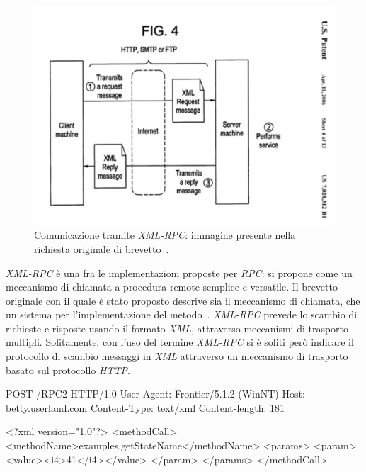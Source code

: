 \begin{figure}[h]
\centering
\includegraphics[scale=0.5, viewport=0 0 646 440]{Immagini/Capitolo3/XMLRPC-patent.pdf}
\caption[Comunicazione tramite \emph{XML-RPC}]{Comunicazione tramite \emph{XML-RPC}: immagine presente nella richiesta originale di brevetto~\cite{MERRICK:2006:misc}.}\label{fig:xmlrpc-patent}
\end{figure}

\emph{XML-RPC} è una fra le implementazioni proposte per \emph{RPC}: si propone come un meccanismo di chiamata a procedura remote semplice e versatile. Il brevetto originale con il quale è stato proposto descrive sia il meccanismo di chiamata, che un sistema per l'implementazione del metodo~\cite{MERRICK:2006:misc}.
\emph{XML-RPC} prevede lo scambio di richieste e risposte usando il formato \emph{XML}, attraverso meccanismi di trasporto multipli. Solitamente, con l'uso del termine \emph{XML-RPC} si è soliti però indicare il protocollo di scambio messaggi in \emph{XML} attraverso un meccanismo di trasporto basato sul protocollo \emph{HTTP}.

\begin{program}
\begin{verbatimtab}

POST /RPC2 HTTP/1.0
User-Agent: Frontier/5.1.2 (WinNT)
Host: betty.userland.com
Content-Type: text/xml
Content-length: 181


<?xml version="1.0"?>
<methodCall>
   <methodName>examples.getStateName</methodName>
   <params>
      <param>
         <value><i4>41</i4></value>
         </param>
      </params>
   </methodCall>
\end{verbatimtab}
\caption{Esempio di chiamata ad una procedura remota usando \emph{XML-RPC over HTTP}}\label{code:xmlrpc-request}
\end{program}

